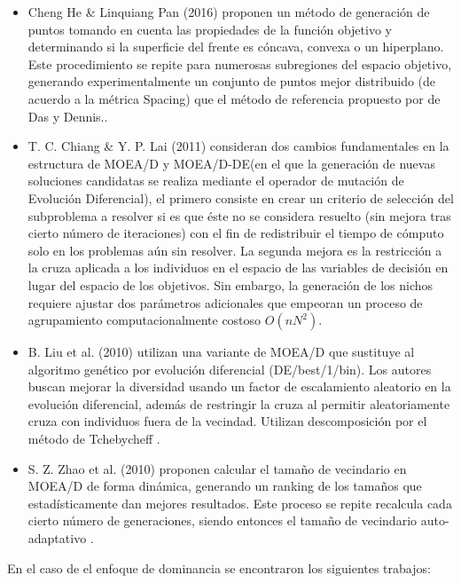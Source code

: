 \documentclass[letterpaper,10pt]{article}
\begin{document}
\begin{itemize}
 \item Cheng He \& Linquiang Pan (2016) proponen un método de generación de puntos tomando en cuenta las propiedades de la función objetivo y determinando si la superficie del frente es cóncava, convexa o un hiperplano. Este procedimiento se repite para numerosas subregiones del espacio objetivo, generando experimentalmente un conjunto de puntos mejor distribuido (de acuerdo a la métrica Spacing) que el método de referencia propuesto por de Das y Dennis.\cite{7748353}.    
 \item T. C. Chiang \& Y. P. Lai (2011) consideran dos cambios fundamentales en la estructura de MOEA/D y MOEA/D-DE(en el que la generación de nuevas soluciones candidatas se realiza mediante el operador de mutación de Evolución Diferencial), el primero consiste en crear un criterio de selección del subproblema a resolver si es que éste no se considera resuelto (sin mejora tras cierto número de iteraciones) con el fin de redistribuir el tiempo de cómputo solo en los problemas aún sin resolver. La segunda mejora es la restricción a la cruza aplicada a los individuos en el espacio de las variables de decisión en lugar del espacio de los objetivos. Sin embargo, la generación de los nichos requiere ajustar dos parámetros adicionales que empeoran un proceso de agrupamiento computacionalmente costoso $O(nN^2)$\cite{5949789}.
 \item B. Liu et al. (2010) utilizan una variante de MOEA/D que sustituye al algoritmo genético por evolución diferencial (DE/best/1/bin). Los autores buscan mejorar la diversidad usando un factor de escalamiento aleatorio en la evolución diferencial, además de restringir la cruza al permitir aleatoriamente cruza con individuos fuera de la vecindad. Utilizan descomposición por el método de Tchebycheff \cite{5585957}.
 \item S. Z. Zhao et al. (2010) proponen calcular el tamaño de vecindario en MOEA/D de forma dinámica, generando un ranking de los tamaños que estadísticamente dan mejores resultados. Este proceso se repite recalcula cada cierto número de generaciones, siendo entonces el tamaño de vecindario auto-adaptativo \cite{6151117}.
\end{itemize}

En el caso de el enfoque de dominancia se encontraron los siguientes trabajos:
\end{document}

